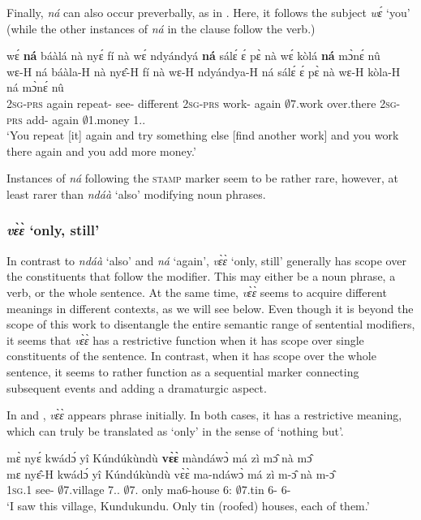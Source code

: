 Finally, {\itshape ná} can also occur preverbally, as in . Here, it follows the subject {\itshape wɛ́} `you' (while the other instances of {\itshape ná} in the clause follow the verb.)

\ea \label{na8}
  \glll wɛ́ {\bfseries ná} báàlá nà nyɛ́ fí nà wɛ́ ndyándyá {\bfseries ná} sálɛ́ ɛ́ pɛ̀ nà wɛ́ kòlá {\bfseries ná} mɔ̀nɛ́ nû \\
      wɛ-H ná báàla-H nà nyɛ̂-H fí nà wɛ-H ndyándya-H ná sálɛ́ ɛ́ pɛ̀ nà wɛ-H kòla-H ná mɔ̀nɛ́ nû \\
         2\textsc{sg}-\textsc{prs} again repeat-{\R} {\COM} see-{\R} different {\COM} 2\textsc{sg}-\textsc{prs} work-{\R} again $\emptyset$7.work {\LOC} over.there {\COM} 2\textsc{sg}-\textsc{prs} add-{\R} again $\emptyset$1.money 1.{\DEM}.{\PROX} \\
    \trans `You repeat [it] again and try something else [find another work] and you work there again and you add more money.'
\z

\noindent Instances of {\itshape ná} following the \textsc{stamp} marker seem to be rather rare, however, at least rarer than {\itshape ndáà} `also' modifying noun phrases. 



\subsubsection*{{\itshape vɛ̀ɛ̀} `only, still'}
In contrast to {\itshape ndáà} `also' and {\itshape ná} `again', {\itshape vɛ̀ɛ̀} `only, still' generally has scope over the constituents that follow the modifier. This may either be a noun phrase, a verb, or the whole sentence. At the same time, {\itshape vɛ̀ɛ̀} seems to acquire different meanings in different contexts, as we will see below. Even though it is beyond the scope of this work to disentangle the entire semantic range of sentential modifiers, it seems that {\itshape vɛ̀ɛ̀} has a restrictive function when it has scope over single constituents of the sentence. In contrast, when it has scope over the whole sentence, it seems to rather function as a sequential marker connecting subsequent events and adding a dramaturgic aspect.


In  and , {\itshape vɛ̀ɛ̀} appears phrase initially. In both cases, it has a restrictive meaning, which can truly be translated as `only' in the sense of `nothing but'.

\ea \label{vee1}
  \glll  mɛ̀ nyɛ́ kwádɔ́ yî Kúndúkùndù {\bfseries vɛ̀ɛ̀} màndáwɔ̀ má zì mɔ̂ nà mɔ̂ \\
         mɛ nyɛ̂-H kwádɔ́ yî Kúndúkùndù vɛ̀ɛ̀ ma-ndáwɔ̀ má zì m-ɔ̂ nà m-ɔ̂ \\
            1\textsc{sg}.{\PST}1 see-{\R} $\emptyset$7.village 7.{\DEM}.{\PROX} $\emptyset$7.{\PN} only ma6-house 6:{\ATT} $\emptyset$7.tin 6-{\OBJ} {\COM} 6-{\OBJ}  \\
    \trans `I saw this village, Kundukundu. Only tin (roofed) houses, each of them.'
\z

